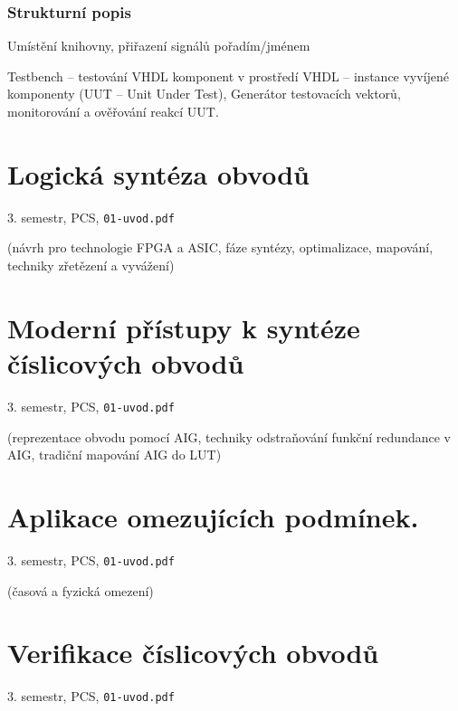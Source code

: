 \documentclass[a4paper, 11pt]{report}
\begin{document}
\subsection{Strukturní popis}
Umístění knihovny, přiřazení signálů pořadím/jménem

Testbench -- testování VHDL komponent v prostředí VHDL -- instance vyvíjené komponenty (UUT -- Unit Under Test), Generátor testovacích vektorů, monitorování a ověřování reakcí UUT.

\chapter{Logická syntéza obvodů} \label{cha:53}
3. semestr, PCS, \texttt{01-uvod.pdf}

(návrh pro technologie FPGA a ASIC, fáze syntézy, optimalizace, mapování, techniky zřetězení a vyvážení)

\chapter{Moderní přístupy k syntéze číslicových obvodů} \label{cha:54}
3. semestr, PCS, \texttt{01-uvod.pdf}

(reprezentace obvodu pomocí AIG, techniky odstraňování funkční redundance v AIG, tradiční mapování AIG do LUT)

\chapter{Aplikace omezujících podmínek.} \label{cha:55}
3. semestr, PCS, \texttt{01-uvod.pdf}

(časová a fyzická omezení)

\chapter{Verifikace číslicových obvodů} \label{cha:56}
3. semestr, PCS, \texttt{01-uvod.pdf}
\end{document}
